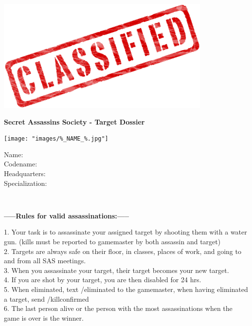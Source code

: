 \documentclass[12pt]{article}
\begin{document}

\vspace*{-70px}
\hspace*{-50px}
\vspace*{-25px}
\includegraphics[scale=0.5]{latex/topsecret.png}
\begin{center}
\textbf{\LARGE{Secret Assassins Society - Target Dossier}}
\end{center}

\begin{minipage}{0.33\textwidth}
\texttt{[image: "images/\%\_NAME\_\%.jpg"]}
\end{minipage}
\hfill
\begin{minipage}{0.55\textwidth}\raggedright\Large

Name:
\\[0.3in]
Codename: 
\\[0.3in]
Headquarters: 
\\[0.3in]
Specialization: 
\\[0.3in]
\end{minipage}
\\[0.3in]
\begin{center}
\textbf{\LARGE{-----Rules for valid assassinations:-----}}
\\[0.2in]
\end{center}
\large{
1. Your task is to assassinate your assigned target by shooting them with a water gun. (kills must be reported to gamemaster by both assassin and target)\\
2. Targets are always safe on their floor, in classes, places of work, and going to and from all SAS meetings.\\
3. When you assassinate your target, their target becomes your new target.\\
4. If you are shot by your target, you are then disabled for 24 hrs.\\
5. When eliminated, text /eliminated to the gamemaster, when having eliminated a target, send /killconfirmed\\
6. The last person alive or the person with the most assassinations when the game is over is the winner.
}
\end{document}
